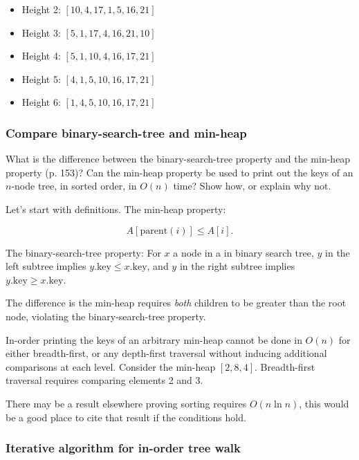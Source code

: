 \documentclass{article}
\begin{document}
\begin{itemize}
  \item Height 2: $[10, 4, 17, 1, 5, 16, 21]$
  \item Height 3: $[5, 1, 17, 4, 16, 21, 10]$
  \item Height 4: $[5, 1, 10, 4, 16, 17, 21]$
  \item Height 5: $[4, 1, 5, 10, 16, 17, 21]$
  \item Height 6: $[1, 4, 5, 10, 16, 17, 21]$
\end{itemize}

\subsubsection{Compare binary-search-tree and min-heap}

What is the difference between the binary-search-tree property and the min-heap
property (p. 153)? Can the min-heap property be used to print out the keys of
an $n$-node tree, in sorted order, in $O(n)$ time?  Show how, or explain why
not.

Let's start with definitions.
The min-heap property:

\begin{equation}
  A[\mathrm{parent}(i)] \leq A[i].
\end{equation}

The binary-search-tree property: For $x$ a node in a in binary search tree,
$y$ in the left subtree implies $y.\mathrm{key} \leq x.\mathrm{key}$, and
$y$ in the right subtree implies $y.\mathrm{key} \geq x.\mathrm{key}$.

The difference is the min-heap requires \emph{both} children to be
greater than the root node, violating the binary-search-tree property.

In-order printing the keys of an arbitrary min-heap cannot be done in $O(n)$
for either breadth-first, or any depth-first traversal without inducing
additional comparisons at each level. Consider the min-heap $[2, 8, 4]$.
Breadth-first traversal requires comparing elements 2 and 3.

There may be a result elsewhere proving sorting requires $O(n\ln n)$,
this would be a good place to cite that result if the conditions hold.

\subsubsection{Iterative algorithm for in-order tree walk}
\end{document}
